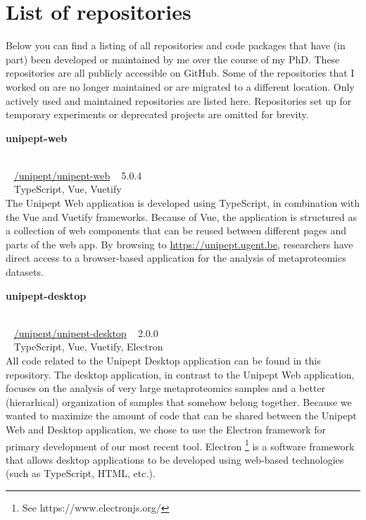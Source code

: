 \chapter*{List of repositories}

Below you can find a listing of all repositories and code packages that have (in part) been developed or maintained by me over the course of my PhD.
These repositories are all publicly accessible on GitHub.
Some of the repositories that I worked on are no longer maintained or are migrated to a different location.
Only actively used and maintained repositories are listed here.
Repositories set up for temporary experiments or deprecated projects are omitted for brevity.

\begin{large}\textbf{\textsf{unipept-web}}\end{large} \\
\faGithub ~ \href{https://github.com/unipept/unipept-web}{\textsf{/unipept/unipept-web}} \hfill \faTag ~ \textsf{5.0.4} \\
\faCode ~ \textsf{TypeScript, Vue, Vuetify} \\
The Unipept Web application is developed using TypeScript, in combination with the Vue and Vuetify frameworks.
Because of Vue, the application is structured as a collection of web components that can be reused between different pages and parts of the web app.
By browsing to \href{https://unipept.ugent.be}{https://unipept.ugent.be}, researchers have direct access to a browser-based application for the analysis of metaproteomics datasets.

\begin{large}\textbf{\textsf{unipept-desktop}}\end{large} \\
\faGithub ~ \href{https://github.com/unipept/unipept-desktop}{\textsf{/unipept/unipept-desktop}} \hfill \faTag ~ \textsf{2.0.0} \\
\faCode ~ \textsf{TypeScript, Vue, Vuetify, Electron} \\
All code related to the Unipept Desktop application can be found in this repository.
The desktop application, in contrast to the Unipept Web application, focuses on the analysis of very large metaproteomics samples and a better (hierarhical) organization of samples that somehow belong together.
Because we wanted to maximize the amount of code that can be shared between the Unipept Web and Desktop application, we chose to use the Electron framework for primary development of our most recent tool.
Electron \footnote{See https://www.electronjs.org/} is a software framework that allows desktop applications to be developed using web-based technologies (such as TypeScript, HTML, etc.).

